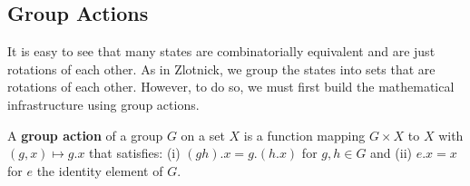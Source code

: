 


\subsection{Group Actions}

It is easy to see that many states are combinatorially equivalent and are just rotations of each other. As in Zlotnick, we group the states into sets that are rotations of each other. However, to do so, we must first build the mathematical infrastructure using group actions. 

\begin{mydef}%
A \textbf{group action} of a group $G$ on a set $X$ is a function mapping $G \times X$ to $X$ with $(g, x) \mapsto g.x$ that satisfies: (i) $(gh).x = g.(h.x)$ for $g,h \in G$ and (ii) $e.x = x$ for $e$ the identity element of $G$.
\end{mydef}


